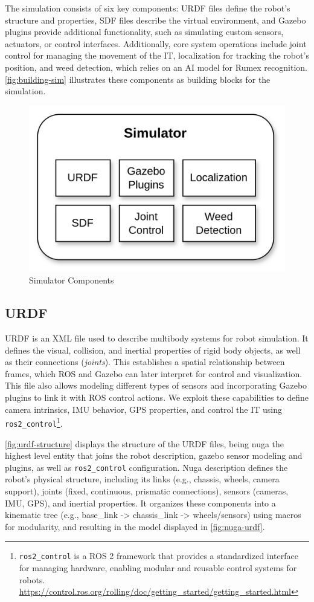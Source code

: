 The simulation consists of six key components: URDF files define the robot's structure and properties, SDF files describe the virtual environment, and Gazebo plugins provide additional functionality, such as simulating custom sensors, actuators, or control interfaces. Additionally, core system operations include joint control for managing the movement of the \ac{IT}, localization for tracking the robot’s position, and weed detection, which relies on an AI model for Rumex recognition. \autoref{fig:building-sim} illustrates these components as building blocks for the simulation.

\begin{figure}
    \centering
    \includegraphics[width=0.5\linewidth]{gfx/ch02/simulator.png}
    \caption{Simulator Components}
    \label{fig:building-sim}
\end{figure}

\subsection{URDF}
\ac{URDF} is an XML file used to describe multibody systems for robot simulation. It defines the visual, collision, and inertial properties of rigid body objects, as well as their connections (\emph{joints}). This establishes a spatial relationship between frames, which ROS and Gazebo can later interpret for control and visualization. This file also allows modeling different types of sensors and incorporating Gazebo plugins to link it with ROS control actions. We exploit these capabilities to define camera intrinsics, IMU behavior, GPS properties, and control the \ac{IT} using \texttt{ros2\_control}\footnote{\texttt{ros2\_control} is a ROS 2 framework that provides a standardized interface for managing hardware, enabling modular and reusable control systems for robots. \url{https://control.ros.org/rolling/doc/getting_started/getting_started.html}}.

\autoref{fig:urdf-structure} displays the structure of the URDF files, being nuga the highest level entity that joins the robot description, gazebo sensor modeling and plugins, as well as \texttt{ros2\_control} configuration. Nuga description defines the robot's physical structure, including its links (e.g., chassis, wheels, camera support), joints (fixed, continuous, prismatic connections), sensors (cameras, IMU, GPS), and inertial properties. It organizes these components into a kinematic tree (e.g., base\_link -> chassis\_link -> wheels/sensors) using macros for modularity, and resulting in the model displayed in \autoref{fig:nuga-urdf}.

